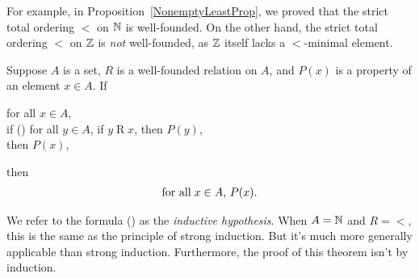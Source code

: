 For example, in Proposition~\ref{NonemptyLeastProp}, we proved that
the strict total ordering $<$ on $\mathbb{N}$ is well-founded.  On the other hand,
the strict total ordering $<$ on $\mathbb{Z}$ is \emph{not} well-founded, as $\mathbb{Z}$
itself lacks a $<$-minimal element.

%
%
\begin{theorem}
Suppose $A$ is a set, $R$ is a well-founded relation on $A$, and
$P(x)$ is a property of an element $x\in A$.
If
\begin{ctabbing}
for all $x\in A$, \\
if {\rm(\dag)} for all $y\in A$, if $y\mathrel{R}x$, then $P(y)$, \\
then $P(x)$,
\end{ctabbing}
then
\begin{gather*}
\allowbreak\mbox{for all}\allowbreak\;x\in A,\,P(x) .
\end{gather*}
\end{theorem}

We refer to the formula (\dag) as the \emph{inductive hypothesis}.
%
%
When $A=\mathbb{N}$ and $R={<}$, this is the same as the principle
of strong induction.  But it's much more generally applicable than
strong induction. Furthermore, the proof of this theorem isn't
by induction.

